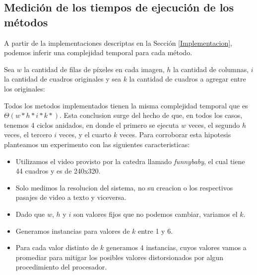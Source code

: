 \subsection{Medición de los tiempos de ejecución de los métodos}
A partir de la implementaciones descriptas en la Sección \ref{Implementacion},
podemos inferir una complejidad temporal para cada método.

Sea $w$ la cantidad de filas de píxeles en cada imagen, $h$ la cantidad de
columnas, $i$ la cantidad de cuadros originales y sea $k$ la cantidad de
cuadros a agregar entre los originales:

Todos los metodos implementados tienen la misma complejidad temporal que es
 $\Theta(w*h*i*k*)$. Esta conclusion surge del hecho de que, en todos los casos,
 tenemos 4 ciclos anidados, en donde el primero se ejecuta $w$ veces, el segundo
 $h$ veces, el tercero $i$ veces, y el cuarto $k$ veces.
\newline
\newline
Para corroborar esta hipotesis planteamos un experimento con las siguientes caracteristicas:
\begin{itemize}
  \item Utilizamos el video provisto por la catedra llamado \textit{funnybaby}, el cual tiene 44 cuadros y es de 240x320.
  \item Solo medimos la resolucion del sistema, no su creacion o los respectivos pasajes de video a texto y viceversa.
  \item Dado que $w$, $h$ y $i$ son valores fijos que no podemos cambiar, variamos el $k$.
  \item Generamos instancias para valores de $k$ entre 1 y 6.
  \item Para cada valor distinto de $k$ generamos 4 instancias, cuyos valores vamos a promediar para mitigar los posibles valores distorsionados por algun procedimiento del procesador.
\end{itemize}

